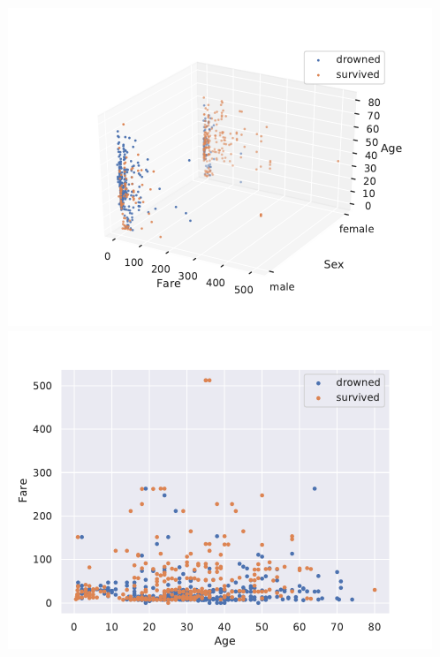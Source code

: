 \documentclass{book}
\begin{document}
\clearpage
\begin{figure}
    \centering
    \includegraphics[scale=0.75]{../figs/scatter3d.pdf}
    \includegraphics[scale=.85]{../figs/scatter2d_Age_Fare.pdf}%
\end{figure}



\clearpage
\end{document}
